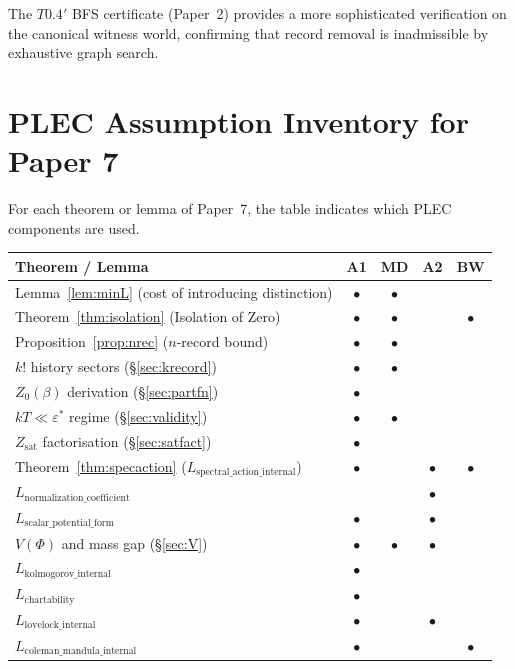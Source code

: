 \documentclass[11pt]{article}
\theoremstyle{definition}
\begin{document}
The $T0.4'$ BFS certificate (Paper~2) provides a more sophisticated verification on the canonical witness world, confirming that record removal is inadmissible by exhaustive graph search.

\section{PLEC Assumption Inventory for Paper 7}\label{app:plec}

For each theorem or lemma of Paper~7, the table indicates which PLEC components are used.

\begin{center}
\begin{tabular}{@{}lcccc@{}}
\toprule
\textbf{Theorem / Lemma} & \textbf{A1} & \textbf{MD} & \textbf{A2} & \textbf{BW} \\ \midrule
Lemma~\ref{lem:minL} (cost of introducing distinction) & $\bullet$ & $\bullet$ & & \\
Theorem~\ref{thm:isolation} (Isolation of Zero) & $\bullet$ & $\bullet$ & & $\bullet$ \\
Proposition~\ref{prop:nrec} ($n$-record bound) & $\bullet$ & $\bullet$ & & \\
$k!$ history sectors (\S\ref{sec:krecord}) & $\bullet$ & $\bullet$ & & \\
$Z_0(\beta)$ derivation (\S\ref{sec:partfn}) & $\bullet$ & & & \\
$kT \ll \varepsilon^*$ regime (\S\ref{sec:validity}) & $\bullet$ & $\bullet$ & & \\
$Z_{\mathrm{sat}}$ factorisation (\S\ref{sec:satfact}) & $\bullet$ & & & \\
Theorem~\ref{thm:specaction} ($L_{\mathrm{spectral\_action\_internal}}$) & $\bullet$ & & $\bullet$ & $\bullet$ \\
$L_{\mathrm{normalization\_coefficient}}$ & & & $\bullet$ & \\
$L_{\mathrm{scalar\_potential\_form}}$ & $\bullet$ & & $\bullet$ & \\
$V(\Phi)$ and mass gap (\S\ref{sec:V}) & $\bullet$ & $\bullet$ & $\bullet$ & \\
$L_{\mathrm{kolmogorov\_internal}}$ & $\bullet$ & & & \\
$L_{\mathrm{chartability}}$ & $\bullet$ & & & \\
$L_{\mathrm{lovelock\_internal}}$ & $\bullet$ & & $\bullet$ & \\
$L_{\mathrm{coleman\_mandula\_internal}}$ & $\bullet$ & & & $\bullet$ \\

\end{tabular}
\end{center}
\end{document}
